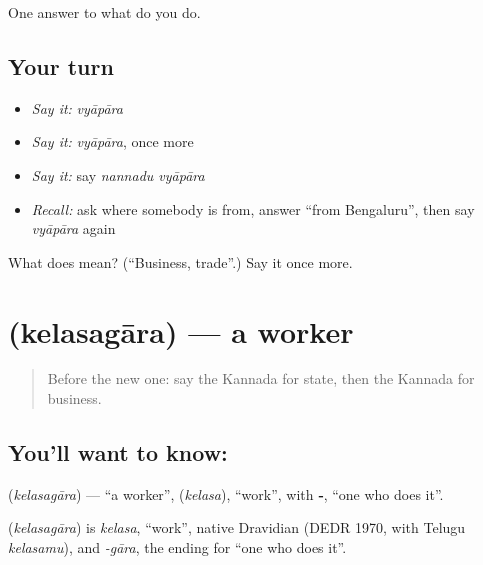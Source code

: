 \begin{grammarlens}[title={What you've built}]
One answer to what do you do.
\end{grammarlens}

\subsection*{Your turn}
\begin{itemize}
\raggedright
  \item \emph{Say it:} \emph{vyāpāra}
  \item \emph{Say it:} \emph{vyāpāra}, once more
  \item \emph{Say it:} say \emph{nannadu vyāpāra}
  \item \emph{Recall:} ask where somebody is from, answer “from Bengaluru”, then say \emph{vyāpāra} again
\end{itemize}

\begin{tcolorbox}[breakable,colback=teal!4,colframe=teal!35!black,title={Before you move on}]
What does  mean? (\textquotedblleft{}Business, trade\textquotedblright{}.) Say it once more.
\end{tcolorbox}
\section[\texorpdfstring{\kn{ಕೆಲಸಗಾರ} (kelasagāra)}{ಕೆಲಸಗಾರ (kelasagāra)}]{ (kelasagāra) — a worker}

\label{lesson:KA-C104-worker}



\begin{quote}
Before the new one: say the Kannada for state, then the Kannada for business.
\end{quote}

\subsection*{You'll want to know: }
\textbf{} (\emph{kelasagāra}) — \textquotedblleft{}a worker\textquotedblright{}, \textbf{} (\emph{kelasa}), \textquotedblleft{}work\textquotedblright{}, with \textbf{‑}, \textquotedblleft{}one who does it\textquotedblright{}.

\begin{cousinweb}
\textbf{} (\emph{kelasagāra}) is \emph{kelasa}, \textquotedblleft{}work\textquotedblright{}, native Dravidian (DEDR 1970, with Telugu \emph{kelasamu}), and \emph{-gāra}, the ending for \textquotedblleft{}one who does it\textquotedblright{}.
\end{cousinweb}

